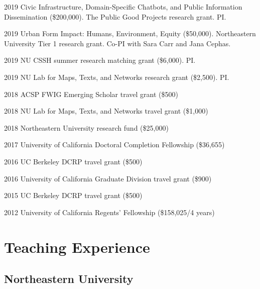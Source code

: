 \documentclass[12pt,letterpaper]{report}
\begin{document}
	\begin{tablist}

		\item[2019] \tab Civic Infrastructure, Domain-Specific Chatbots, and Public Information Dissemination (\$200,000). The Public Good Projects research grant. PI.
		
		\item[2019] \tab Urban Form Impact: Humans, Environment, Equity (\$50,000). Northeastern University Tier 1 research grant. Co-PI with Sara Carr and Jana Cephas.

		\item[2019] \tab NU CSSH summer research matching grant (\$6,000). PI.

		\item[2019] \tab NU Lab for Maps, Texts, and Networks research grant (\$2,500). PI.

		\item[2018] \tab ACSP FWIG Emerging Scholar travel grant (\$500)

		\item[2018] \tab NU Lab for Maps, Texts, and Networks travel grant (\$1,000)

		\item[2018] \tab Northeastern University research fund (\$25,000)

		\item[2017] \tab University of California Doctoral Completion Fellowship (\$36,655)

		\item[2016] \tab UC Berkeley DCRP travel grant (\$500)

		\item[2016] \tab University of California Graduate Division travel grant (\$900)

		\item[2015] \tab UC Berkeley DCRP travel grant (\$500)

		\item[2012] \tab University of California Regents' Fellowship (\$158,025/4 years)

	\end{tablist}



	\section*{Teaching Experience}

	\subsection*{Northeastern University}
\end{document}
